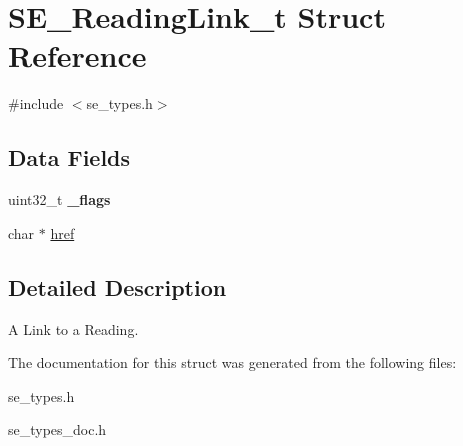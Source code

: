\hypertarget{structSE__ReadingLink__t}{}\section{S\+E\+\_\+\+Reading\+Link\+\_\+t Struct Reference}
\label{structSE__ReadingLink__t}


{\ttfamily \#include $<$se\+\_\+types.\+h$>$}

\subsection*{Data Fields}
\begin{DoxyCompactItemize}
\item 
uint32\+\_\+t {\bfseries \+\_\+flags}
\item 
char $\ast$ \hyperlink{group__ReadingLink_ga093e79012e3d23ed5d04d10beab9b49b}{href}
\end{DoxyCompactItemize}


\subsection{Detailed Description}
A Link to a Reading. 

The documentation for this struct was generated from the following files\+:\begin{DoxyCompactItemize}
\item 
se\+\_\+types.\+h\item 
se\+\_\+types\+\_\+doc.\+h\end{DoxyCompactItemize}
